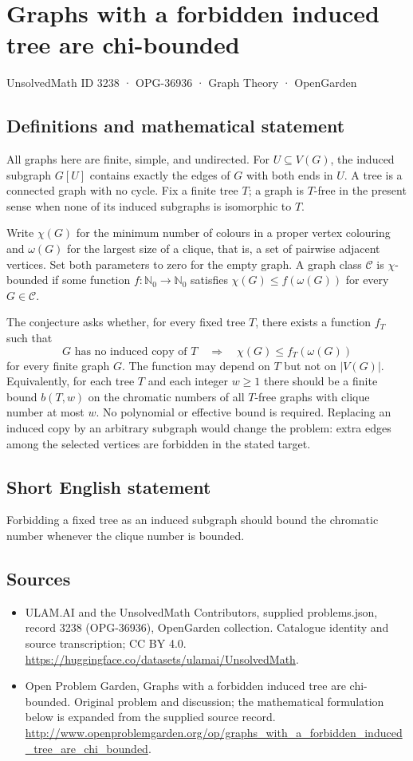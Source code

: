 \documentclass[11pt,a4paper]{article}
\begin{document}
\section*{Graphs with a forbidden induced tree are chi-bounded}\label{3238}
{\small UnsolvedMath ID 3238 · OPG-36936 · Graph Theory · OpenGarden}
\subsection{Definitions and mathematical statement}
All graphs here are finite, simple, and undirected. For $U\subseteq V(G)$,
the induced subgraph $G[U]$ contains exactly the edges of $G$ with both ends
in $U$. A tree is a connected graph with no cycle. Fix a finite tree $T$;
a graph is $T$-free in the present sense when none of its induced subgraphs
is isomorphic to $T$.

Write $\chi(G)$ for the minimum number of colours in a proper vertex
colouring and $\omega(G)$ for the largest size of a clique, that is, a set
of pairwise adjacent vertices. Set both parameters to zero for the empty
graph. A graph class $\mathcal C$ is $\chi$-bounded if some function
$f:\mathbb N_0\to\mathbb N_0$ satisfies
$\chi(G)\le f(\omega(G))$ for every $G\in\mathcal C$.

The conjecture asks whether, for every fixed tree $T$, there exists a
function $f_T$ such that
\[
  G\text{ has no induced copy of }T
       \quad\Longrightarrow\quad\chi(G)\le f_T(\omega(G))
\]
for every finite graph $G$. The function may depend on $T$ but not on
$|V(G)|$. Equivalently, for each tree $T$ and each integer $w\ge1$ there
should be a finite bound $b(T,w)$ on the chromatic numbers of all
$T$-free graphs with clique number at most $w$. No polynomial or effective
bound is required. Replacing an induced copy by an arbitrary subgraph
would change the problem: extra edges among the selected vertices are
forbidden in the stated target.
\subsection{Short English statement}
Forbidding a fixed tree as an induced subgraph should bound the chromatic number whenever the clique number is bounded.
\subsection{Sources}
\begin{itemize}
\item[S1] ULAM.AI and the UnsolvedMath Contributors, supplied problems.json, record 3238 (OPG-36936), OpenGarden collection. Catalogue identity and source transcription; CC BY 4.0.
\url{https://huggingface.co/datasets/ulamai/UnsolvedMath}.
\item[S2] Open Problem Garden, Graphs with a forbidden induced tree are chi-bounded. Original problem and discussion; the mathematical formulation below is expanded from the supplied source record.
\url{http://www.openproblemgarden.org/op/graphs_with_a_forbidden_induced_tree_are_chi_bounded}.
\end{itemize}
\end{document}
